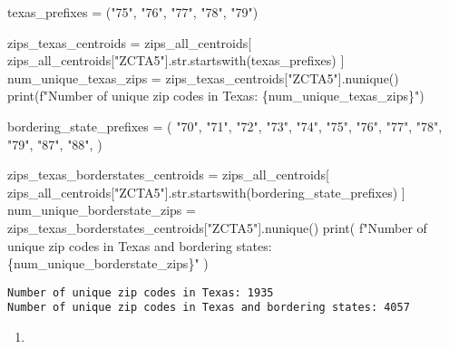 \documentclass[
  letterpaper,
  DIV=11,
  numbers=noendperiod]{scrartcl}
\newenvironment{Shaded}{\begin{snugshade}}{\end{snugshade}}
\newcommand{\BuiltInTok}[1]{\textcolor[rgb]{0.00,0.23,0.31}{#1}}
\newcommand{\NormalTok}[1]{\textcolor[rgb]{0.00,0.23,0.31}{#1}}
\newcommand{\OperatorTok}[1]{\textcolor[rgb]{0.37,0.37,0.37}{#1}}
\newcommand{\SpecialCharTok}[1]{\textcolor[rgb]{0.37,0.37,0.37}{#1}}
\newcommand{\SpecialStringTok}[1]{\textcolor[rgb]{0.13,0.47,0.30}{#1}}
\newcommand{\StringTok}[1]{\textcolor[rgb]{0.13,0.47,0.30}{#1}}
\providecommand{\tightlist}{%
  \setlength{\itemsep}{0pt}\setlength{\parskip}{0pt}}\usepackage{longtable,booktabs,array}
\begin{document}
\begin{Shaded}
\begin{Highlighting}[]
\NormalTok{texas\_prefixes }\OperatorTok{=}\NormalTok{ (}\StringTok{"75"}\NormalTok{, }\StringTok{"76"}\NormalTok{, }\StringTok{"77"}\NormalTok{, }\StringTok{"78"}\NormalTok{, }\StringTok{"79"}\NormalTok{)}

\NormalTok{zips\_texas\_centroids }\OperatorTok{=}\NormalTok{ zips\_all\_centroids[}
\NormalTok{    zips\_all\_centroids[}\StringTok{"ZCTA5"}\NormalTok{].}\BuiltInTok{str}\NormalTok{.startswith(texas\_prefixes)}
\NormalTok{]}
\NormalTok{num\_unique\_texas\_zips }\OperatorTok{=}\NormalTok{ zips\_texas\_centroids[}\StringTok{"ZCTA5"}\NormalTok{].nunique()}
\BuiltInTok{print}\NormalTok{(}\SpecialStringTok{f"Number of unique zip codes in Texas: }\SpecialCharTok{\{}\NormalTok{num\_unique\_texas\_zips}\SpecialCharTok{\}}\SpecialStringTok{"}\NormalTok{)}

\NormalTok{bordering\_state\_prefixes }\OperatorTok{=}\NormalTok{ (}
    \StringTok{"70"}\NormalTok{,}
    \StringTok{"71"}\NormalTok{,}
    \StringTok{"72"}\NormalTok{,}
    \StringTok{"73"}\NormalTok{,}
    \StringTok{"74"}\NormalTok{,}
    \StringTok{"75"}\NormalTok{,}
    \StringTok{"76"}\NormalTok{,}
    \StringTok{"77"}\NormalTok{,}
    \StringTok{"78"}\NormalTok{,}
    \StringTok{"79"}\NormalTok{,}
    \StringTok{"87"}\NormalTok{,}
    \StringTok{"88"}\NormalTok{,}
\NormalTok{)}

\NormalTok{zips\_texas\_borderstates\_centroids }\OperatorTok{=}\NormalTok{ zips\_all\_centroids[}
\NormalTok{    zips\_all\_centroids[}\StringTok{"ZCTA5"}\NormalTok{].}\BuiltInTok{str}\NormalTok{.startswith(bordering\_state\_prefixes)}
\NormalTok{]}
\NormalTok{num\_unique\_borderstate\_zips }\OperatorTok{=}\NormalTok{ zips\_texas\_borderstates\_centroids[}\StringTok{"ZCTA5"}\NormalTok{].nunique()}
\BuiltInTok{print}\NormalTok{(}
    \SpecialStringTok{f"Number of unique zip codes in Texas and bordering states: }\SpecialCharTok{\{}\NormalTok{num\_unique\_borderstate\_zips}\SpecialCharTok{\}}\SpecialStringTok{"}
\NormalTok{)}
\end{Highlighting}
\end{Shaded}

\begin{verbatim}
Number of unique zip codes in Texas: 1935
Number of unique zip codes in Texas and bordering states: 4057
\end{verbatim}

\begin{enumerate}
\def\labelenumi{\arabic{enumi}.}
\setcounter{enumi}{2}
\tightlist
\item
\end{enumerate}
\end{document}
